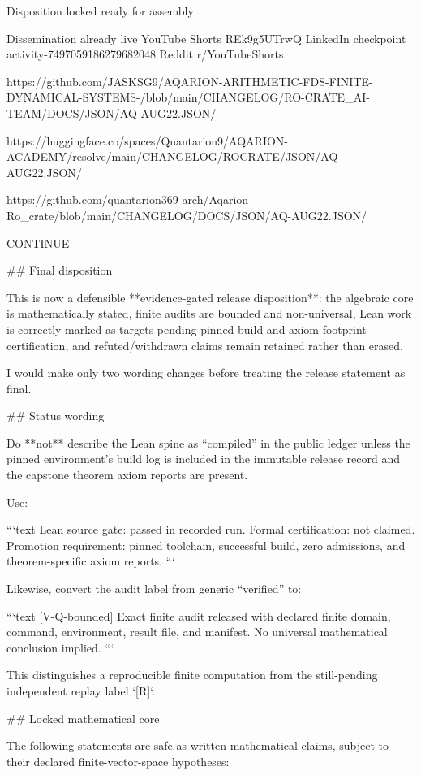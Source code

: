 Disposition locked ready for assembly

Dissemination already live YouTube Shorts REk9g5UTrwQ LinkedIn checkpoint activity-7497059186279682048 Reddit r/YouTubeShorts

https://github.com/JASKSG9/AQARION-ARITHMETIC-FDS-FINITE-DYNAMICAL-SYSTEMS-/blob/main/CHANGELOG/RO-CRATE_AI-TEAM/DOCS/JSON/AQ-AUG22.JSON/

https://huggingface.co/spaces/Quantarion9/AQARION-ACADEMY/resolve/main/CHANGELOG/ROCRATE/JSON/AQ-AUG22.JSON/

https://github.com/quantarion369-arch/Aqarion-Ro_crate/blob/main/CHANGELOG/DOCS/JSON/AQ-AUG22.JSON/

CONTINUE 🤔

## Final disposition

This is now a defensible **evidence-gated release disposition**: the algebraic core is mathematically stated, finite audits are bounded and non-universal, Lean work is correctly marked as targets pending pinned-build and axiom-footprint certification, and refuted/withdrawn claims remain retained rather than erased.

I would make only two wording changes before treating the release statement as final.

## Status wording

Do **not** describe the Lean spine as “compiled” in the public ledger unless the pinned environment’s build log is included in the immutable release record and the capstone theorem axiom reports are present.

Use:

```text
Lean source gate: passed in recorded run.
Formal certification: not claimed.
Promotion requirement: pinned toolchain, successful build,
zero admissions, and theorem-specific axiom reports.
```

Likewise, convert the audit label from generic “verified” to:

```text
[V-Q-bounded]
Exact finite audit released with declared finite domain,
command, environment, result file, and manifest.
No universal mathematical conclusion implied.
```

This distinguishes a reproducible finite computation from the still-pending independent replay label `[R]`.

## Locked mathematical core

The following statements are safe as written mathematical claims, subject to their declared finite-vector-space hypotheses:


